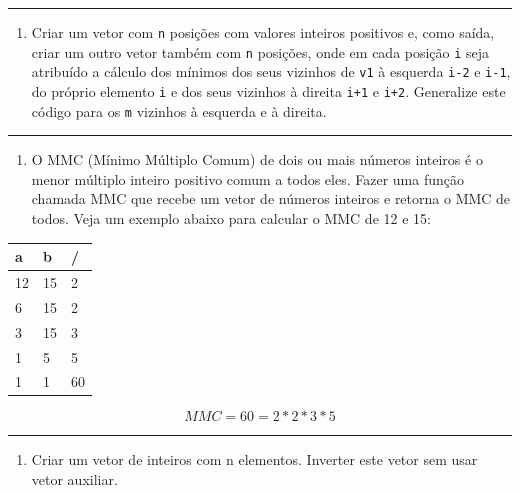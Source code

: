 \documentclass[12pt,a4paper]{article}
\providecommand{\tightlist}{%
      \setlength{\itemsep}{0pt}\setlength{\parskip}{0pt}}
\begin{document}
    \begin{center}\rule{0.5\linewidth}{0.5pt}\end{center}

\begin{enumerate}
\def\labelenumi{\arabic{enumi}.}
\setcounter{enumi}{1}
\tightlist
\item
  Criar um vetor com \texttt{n} posições com valores inteiros positivos
  e, como saída, criar um outro vetor também com \texttt{n} posições,
  onde em cada posição \texttt{i} seja atribuído a cálculo dos mínimos
  dos seus vizinhos de \texttt{v1} à esquerda \texttt{i-2} e
  \texttt{i-1}, do próprio elemento \texttt{i} e dos seus vizinhos à
  direita \texttt{i+1} e \texttt{i+2}. Generalize este código para os
  \texttt{m} vizinhos à esquerda e à direita.
\end{enumerate}

    \begin{center}\rule{0.5\linewidth}{0.5pt}\end{center}

\begin{enumerate}
\def\labelenumi{\arabic{enumi}.}
\setcounter{enumi}{2}
\tightlist
\item
  O MMC (Mínimo Múltiplo Comum) de dois ou mais números inteiros é o
  menor múltiplo inteiro positivo comum a todos eles. Fazer uma função
  chamada MMC que recebe um vetor de números inteiros e retorna o MMC de
  todos. Veja um exemplo abaixo para calcular o MMC de 12 e 15:
\end{enumerate}

    \begin{longtable}[]{@{}lll@{}}
\toprule()
a & b & / \\
\midrule()
\endhead
12 & 15 & 2 \\
6 & 15 & 2 \\
3 & 15 & 3 \\
1 & 5 & 5 \\
1 & 1 & 60 \\
\bottomrule()
\end{longtable}

\[MMC = 60 = 2*2*3*5\]

    \begin{center}\rule{0.5\linewidth}{0.5pt}\end{center}

\begin{enumerate}
\def\labelenumi{\arabic{enumi}.}
\setcounter{enumi}{3}
\tightlist
\item
  Criar um vetor de inteiros com n elementos. Inverter este vetor sem
  usar vetor auxiliar.
\end{enumerate}
\end{document}

